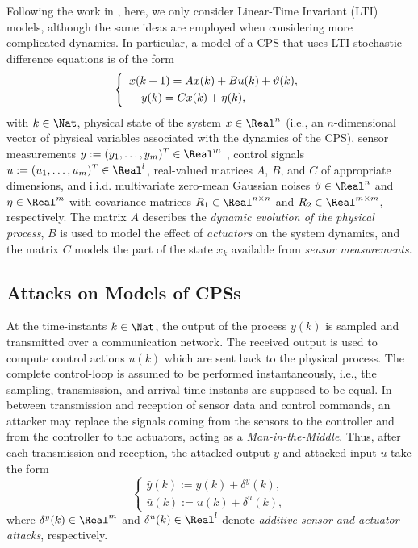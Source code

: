 {Following the work in \cite{CPSAttacksAgainstPCS,LimitingImpactStealthyAttacks,CPSDetectingIntegrityAttacksScada,CPSIntegrityAttacks,Carlos_Justin1,Carlos_Justin2,Carlos_Justin3}, here, we only consider Linear-Time Invariant (LTI) models, although the same ideas are employed when considering more complicated dynamics. In particular, a model of a CPS that uses LTI stochastic difference equations is of the form
\begin{equation}
\left\{
\begin{array}{ll}
{x}({k+1}) = Ax(k) + B u(k) + \vartheta(k),  \label{1} \\[1mm]
\hspace{3.8mm} y(k) = Cx(k) + \eta(k),
\end{array}
\right.
\end{equation}
with $k\in \Nat$, physical state of the system $x \in \Real^n$ (i.e., an $n$-dimensional vector of physical variables associated with the dynamics of the CPS), sensor measurements $y := (y_1,\ldots,y_m)^T \in \Real^m$ , control signals $u := (u_1,\ldots,u_m)^T \in \Real^l$, real-valued matrices $A$, $B$, and $C$ of appropriate dimensions, and i.i.d. multivariate zero-mean Gaussian noises $\vartheta \in \Real^n$ and $\eta \in \Real^m$ with covariance matrices $R_{1} \in \Real^{n \times n}$ and $R_2 \in \Real^{m \times m}$, respectively. The matrix $A$ describes the \emph{dynamic evolution of the physical process}, $B$ is used to model the effect of \emph{actuators} on the system dynamics, and the matrix $C$ models the part of the state $x_k$ available from \emph{sensor measurements}.

\subsection{Attacks on Models of CPSs}
\label{sec:AttacksOnModels} 
At the time-instants $k \in \Nat$, the output of the process $y(k)$ is sampled and transmitted over a communication network. The received output is used to compute control actions $u(k)$ which are sent back to the physical process. The complete control-loop is assumed to be performed instantaneously, i.e., the sampling, transmission, and arrival time-instants are supposed to be equal.
In between transmission and reception of sensor data and control commands, an attacker may replace the signals coming from the sensors to the controller and from the controller to the actuators, acting as a \emph{Man-in-the-Middle}. Thus, after each transmission and reception, the attacked output $\bar{y}$ and attacked input $\bar{u}$ take the form
\begin{equation}
\left\{
\begin{array}{ll}
\bar{y}(k) := y(k) + \delta^y(k) 
, \label{3}\\[1mm]
\bar{u}(k) := u(k) + \delta^u(k),
\end{array}\right.
\end{equation}
where $\delta^y(k) \in \Real^m$ and $\delta^u(k) \in \Real^l$ denote \emph{additive sensor and actuator attacks}, respectively.

}
